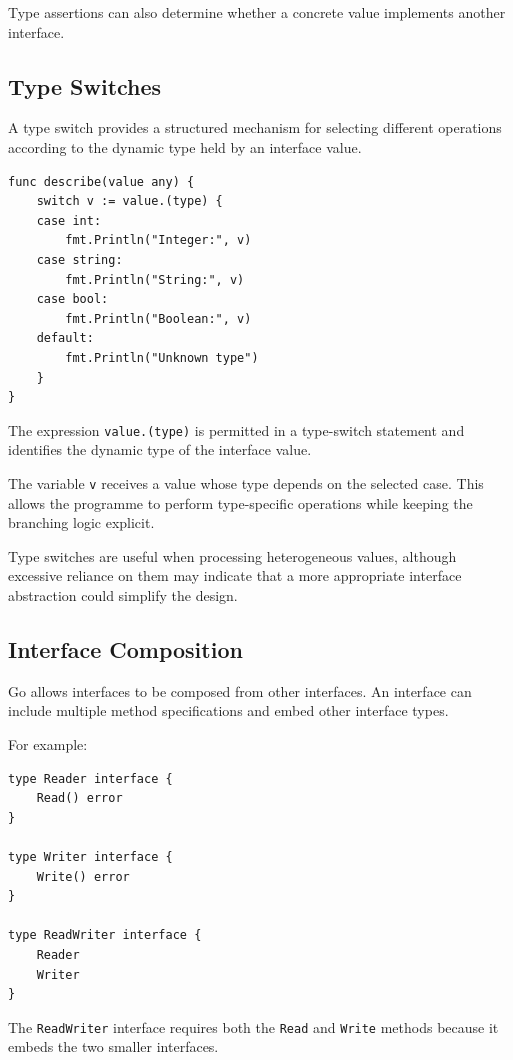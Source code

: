 Type assertions can also determine whether a concrete value implements another interface.

\subsection{Type Switches}

A type switch provides a structured mechanism for selecting different operations according to the dynamic type held by an interface value.

\begin{lstlisting}
func describe(value any) {
    switch v := value.(type) {
    case int:
        fmt.Println("Integer:", v)
    case string:
        fmt.Println("String:", v)
    case bool:
        fmt.Println("Boolean:", v)
    default:
        fmt.Println("Unknown type")
    }
}
\end{lstlisting}

The expression \texttt{value.(type)} is permitted in a type-switch statement and identifies the dynamic type of the interface value.

The variable \texttt{v} receives a value whose type depends on the selected case. This allows the programme to perform type-specific operations while keeping the branching logic explicit.

Type switches are useful when processing heterogeneous values, although excessive reliance on them may indicate that a more appropriate interface abstraction could simplify the design.

\subsection{Interface Composition}

Go allows interfaces to be composed from other interfaces. An interface can include multiple method specifications and embed other interface types.

For example:

\begin{lstlisting}
type Reader interface {
    Read() error
}

type Writer interface {
    Write() error
}

type ReadWriter interface {
    Reader
    Writer
}
\end{lstlisting}

The \texttt{ReadWriter} interface requires both the \texttt{Read} and \texttt{Write} methods because it embeds the two smaller interfaces.


